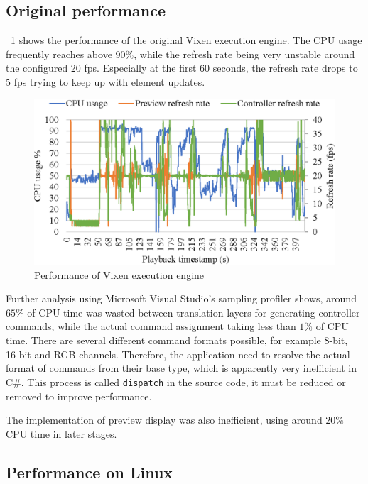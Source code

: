 \documentclass[journal]{IEEEtran}
\newcommand{\fref}[1]{\figurename~\ref{#1}}
\begin{document}

\subsection{Original performance}

\fref{fig:original} shows the performance of the original Vixen execution engine. The CPU usage frequently reaches above $90 \%$, while the refresh rate being very unstable around the configured 20 fps. Especially at the first 60 seconds, the refresh rate drops to 5 fps trying to keep up with element updates. 

\begin{figure}[t]
    \centering
    \includegraphics[width=0.8\columnwidth]{original}
    \caption{Performance of Vixen execution engine}
    \label{fig:original}
\end{figure}

Further analysis using Microsoft Visual Studio's sampling profiler shows, around $65 \%$ of CPU time was wasted between translation layers for generating controller commands, while the actual command assignment taking less than $1 \%$ of CPU time. There are several different command formats possible, for example 8-bit, 16-bit and RGB channels. Therefore, the application need to resolve the actual format of commands from their base type, which is apparently very inefficient in C\#. This process is called \texttt{dispatch} in the source code, it must be reduced or removed to improve performance. 

The implementation of preview display was also inefficient, using around $20 \%$ CPU time in later stages.


\subsection{Performance on Linux}
\end{document}
